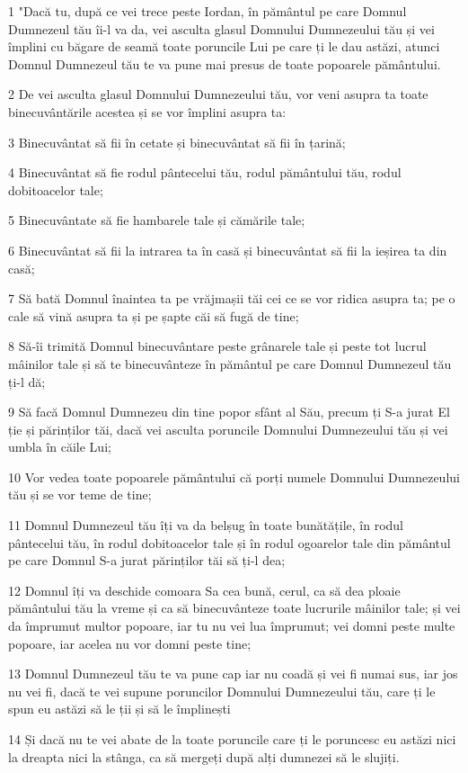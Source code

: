 \par 1 "Dacă tu, după ce vei trece peste Iordan, în pământul pe care Domnul Dumnezeul tău îi-l va da, vei asculta glasul Domnului Dumnezeului tău și vei împlini cu băgare de seamă toate poruncile Lui pe care ți le dau astăzi, atunci Domnul Dumnezeul tău te va pune mai presus de toate popoarele pământului.
\par 2 De vei asculta glasul Domnului Dumnezeului tău, vor veni asupra ta toate binecuvântările acestea și se vor împlini asupra ta:
\par 3 Binecuvântat să fii în cetate și binecuvântat să fii în țarină;
\par 4 Binecuvântat să fie rodul pântecelui tău, rodul pământului tău, rodul dobitoacelor tale;
\par 5 Binecuvântate să fie hambarele tale și cămările tale;
\par 6 Binecuvântat să fii la intrarea ta în casă și binecuvântat să fii la ieșirea ta din casă;
\par 7 Să bată Domnul înaintea ta pe vrăjmașii tăi cei ce se vor ridica asupra ta; pe o cale să vină asupra ta și pe șapte căi să fugă de tine;
\par 8 Să-îi trimită Domnul binecuvântare peste grânarele tale și peste tot lucrul mâinilor tale și să te binecuvânteze în pământul pe care Domnul Dumnezeul tău ți-l dă;
\par 9 Să facă Domnul Dumnezeu din tine popor sfânt al Său, precum ți S-a jurat El ție și părinților tăi, dacă vei asculta poruncile Domnului Dumnezeului tău și vei umbla în căile Lui;
\par 10 Vor vedea toate popoarele pământului că porți numele Domnului Dumnezeului tău și se vor teme de tine;
\par 11 Domnul Dumnezeul tău îți va da belșug în toate bunătățile, în rodul pântecelui tău, în rodul dobitoacelor tale și în rodul ogoarelor tale din pământul pe care Domnul S-a jurat părinților tăi să ți-l dea;
\par 12 Domnul îți va deschide comoara Sa cea bună, cerul, ca să dea ploaie pământului tău la vreme și ca să binecuvânteze toate lucrurile mâinilor tale; și vei da împrumut multor popoare, iar tu nu vei lua împrumut; vei domni peste multe popoare, iar acelea nu vor domni peste tine;
\par 13 Domnul Dumnezeul tău te va pune cap iar nu coadă și vei fi numai sus, iar jos nu vei fi, dacă te vei supune poruncilor Domnului Dumnezeului tău, care ți le spun eu astăzi să le ții și să le împlinești
\par 14 Și dacă nu te vei abate de la toate poruncile care ți le poruncesc eu astăzi nici la dreapta nici la stânga, ca să mergeți după alți dumnezei să le slujiți.
